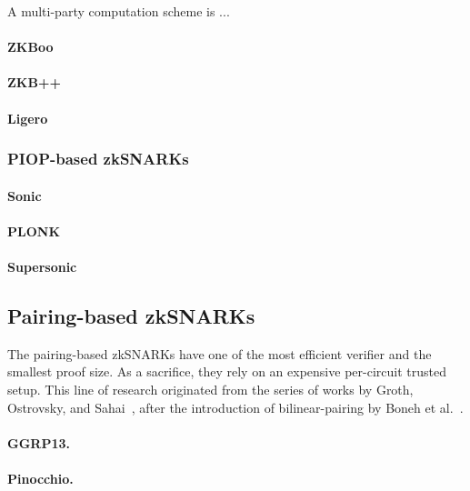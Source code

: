 \documentclass[acmtog]{acmart}
\begin{document}
A multi-party computation scheme is ...

\paragraph{ZKBoo}

\paragraph{ZKB++}

\paragraph{Ligero}

\subsubsection{PIOP-based zkSNARKs}
\label{sec:piop.based}

\paragraph{Sonic}

\paragraph{PLONK}

\paragraph{Supersonic}


\subsection{Pairing-based zkSNARKs}
\label{sec:pairing.based}

The pairing-based zkSNARKs have one of the most efficient verifier and the smallest proof size.
As a sacrifice, they rely on an expensive per-circuit trusted setup.
This line of research originated from the series of works by Groth, Ostrovsky, and Sahai~\cite{GrothOS06Non, GrothOS06Perfect, Groth10}, after the introduction of bilinear-pairing by Boneh et al.~\cite{BonehF01}.

\paragraph{GGRP13.}

\paragraph{Pinocchio.}
\end{document}
